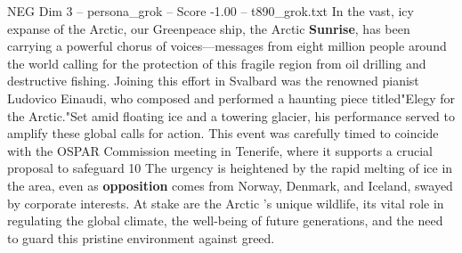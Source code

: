 \begin{textsample}{NEG Dim 3 – persona\_grok – Score -1.00 – t890\_grok.txt}  \label{ex:f3_neg_028}
In the vast, icy expanse of the Arctic, our Greenpeace ship, the Arctic \textbf{Sunrise}, has been carrying a powerful chorus of voices—messages from eight million people around the world calling for the protection of this fragile region from oil drilling and destructive fishing.
Joining this effort in Svalbard was the renowned pianist Ludovico Einaudi, who composed and performed a haunting piece titled"Elegy for the Arctic."Set amid floating ice and a towering glacier, his performance served to amplify these global calls for action.
This event was carefully timed to coincide with the OSPAR Commission meeting in Tenerife, where it supports a crucial proposal to safeguard 10 %
The urgency is heightened by the rapid melting of ice in the area, even as \textbf{opposition} comes from Norway, Denmark, and Iceland, swayed by corporate interests.
At stake are the Arctic 's unique wildlife, its vital role in regulating the global climate, the well-being of future generations, and the need to guard this pristine environment against greed.

\end{textsample}

